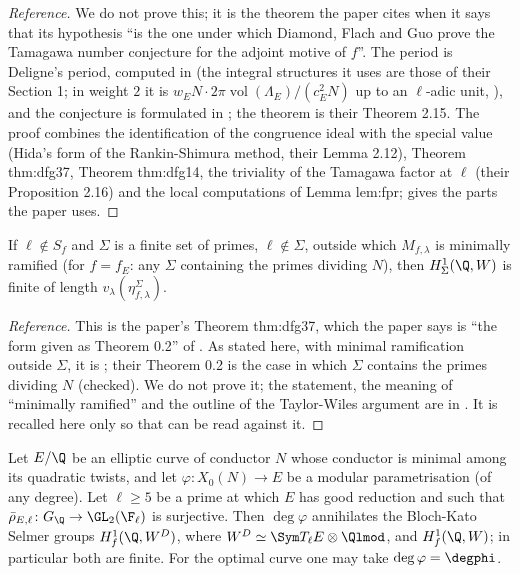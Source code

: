\begin{proof}[Reference]
We do not prove this; it is the theorem the paper cites when it says that its hypothesis ``is the one under which Diamond, Flach and Guo prove the Tamagawa
number conjecture for the adjoint motive of $f$''. The period is Deligne's period, computed in \cite[Section 2.3, Theorem 2.10]{DFG04} (the integral structures it uses are those of their Section 1; in weight $2$ it is
$w_EN\cdot2\pi\operatorname{vol}(\Lambda_E)/(c_E^2N)$ up to an $\ell$-adic unit, ),
and the conjecture is formulated in \cite[Section 2.4, Conjecture 2.14]{DFG04}; the theorem is their Theorem 2.15. The proof combines the identification of
the congruence ideal with the special value (Hida's form of the Rankin-Shimura method, their Lemma 2.12), Theorem thm:dfg37, Theorem thm:dfg14, the triviality of the
Tamagawa factor at $\ell$ (their Proposition 2.16) and the local computations of Lemma lem:fpr;  gives the parts the paper uses.
\end{proof}

\begin{theorem}\label{thm:blochkato:dfg-02}
If $\ell\notin S_f$ and $\Sigma$ is a finite set of primes, $\ell\notin\Sigma$, outside which $M_{f,\lambda}$ is minimally ramified (for $f=f_E$: any $\Sigma$ containing the primes dividing $N$),
then $H^1_\Sigma(\Q,W)$ is finite of length $v_\lambda(\eta^\Sigma_{f,\lambda})$.
\end{theorem}

\begin{proof}[Reference]
This is the paper's Theorem thm:dfg37, which the paper says is ``the form given as Theorem 0.2'' of \cite{DFG04}. As stated here, with minimal ramification outside $\Sigma$,
it is \cite[Theorem 3.7]{DFG04}; their Theorem 0.2 is the case in which $\Sigma$ contains the primes dividing $N$ (checked). We do not prove it; the statement, the meaning of
``minimally ramified'' and the outline of the Taylor-Wiles argument are in . It is recalled here only so that  can be
read against it.
\end{proof}

\begin{theorem}[Flach]\label{thm:blochkato:flach}
Let $E/\Q$ be an elliptic curve of conductor $N$ whose conductor is minimal among its quadratic twists, and let $\varphi\colon X_0(N)\to E$ be a modular parametrisation (of any
degree). Let $\ell\ge5$ be a prime at which $E$ has good reduction and such that $\bar\rho_{E,\ell}\colon G_\Q\to\GL_2(\F_\ell)$ is surjective. Then $\deg\varphi$ annihilates the
Bloch-Kato Selmer groups $H^1_f(\Q,W^D)$, where $W^D\simeq\Sym T_\ell E\otimes\Qlmod$, and $H^1_f(\Q,W)$; in particular both are finite. For the optimal curve one may take
$\deg\varphi=\degphi$.
\end{theorem}

